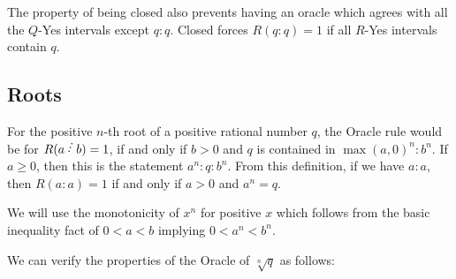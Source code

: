 \documentclass[12pt]{article}
\theoremstyle{remark}
\begin{document}
The property of being closed also prevents having an oracle which agrees with all the $Q$-Yes intervals except $q:q$. Closed forces $R(q:q)=1$ if all $R$-Yes intervals contain $q$.

\subsection{Roots}\label{sec:roots}

For the positive $n$-th root of a positive rational number $q$, the Oracle rule would be for $R(a\lte b) = 1$, if and only if $b> 0$ and $q$ is contained in $\max(a,0)^n:b^n$. If $a\geq 0$, then this is the statement $a^n:q:b^n$. From this definition, if we have $a:a$, then $R(a:a) = 1$ if and only if $a>0$ and $a^n = q$.

We will use the monotonicity of $x^n$ for positive $x$ which follows from the basic inequality fact of $ 0 < a < b$ implying $0 < a^n < b^n$.

We can verify the properties of the Oracle of $\sqrt[n]{q}$ as follows: 
\end{document}
